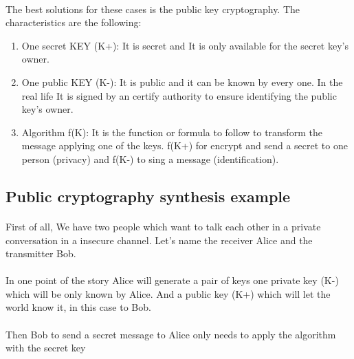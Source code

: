 \documentclass{article}
\begin{document}
\paragraph{}
The best solutions for these cases is the public key cryptography. The characteristics are the following:
\begin{enumerate}
    \item One secret KEY (K+): It is secret and It is only available for the secret key's owner.
    \item One public KEY (K-): It is public and it can be known by every one. In the real life It is signed by an certify authority to ensure identifying the public key's owner.
    \item Algorithm f(K): It is the function or formula to follow to transform the message applying one of the keys. f(K+) for encrypt and send a secret to one person (privacy) and f(K-) to sing a message (identification).
\end{enumerate}
\subsection{Public cryptography synthesis example}
\paragraph{}
First of all, We have two people which want to talk each other in a private conversation in a insecure channel. Let's name the receiver Alice and the transmitter Bob.
\paragraph{}
In one point of the story Alice will generate a pair of keys one private key (K-) which will be only known by Alice. And a public key (K+) which will let the world know it, in this case to Bob.
\paragraph{}
Then Bob to send a secret message to Alice only needs to apply the algorithm with the secret key
\end{document}

